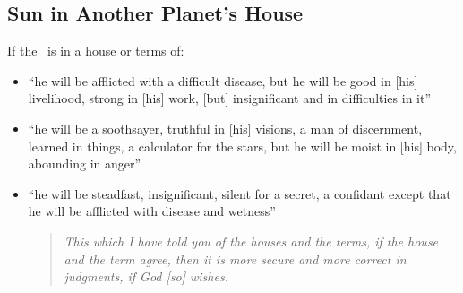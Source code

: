\subsection{Sun in Another Planet's House}
If the \Sun\, is in a house or terms of:
\begin{itemize}[topsep=0em,itemsep=0em]
\item[\Mars] ``he will be afflicted with a difficult disease, but he will be good in [his] livelihood, strong in [his] work, [but] insignificant and in difficulties in it''

\item[\Venus] ``he will be a soothsayer, truthful in [his] visions, a man of discernment, learned in things, a calculator for the stars, but he will be moist in [his] body, abounding in anger''

\item[\Mercury] ``he will be steadfast, insignificant, silent for a secret, a confidant except that he will be afflicted with disease and wetness''

\begin{quote}
\textsl{This which I have told you of the houses and the terms, if the house and the term agree, then it is more secure and more correct in judgments, if God [so] wishes.}
\end{quote}

\end{itemize}

